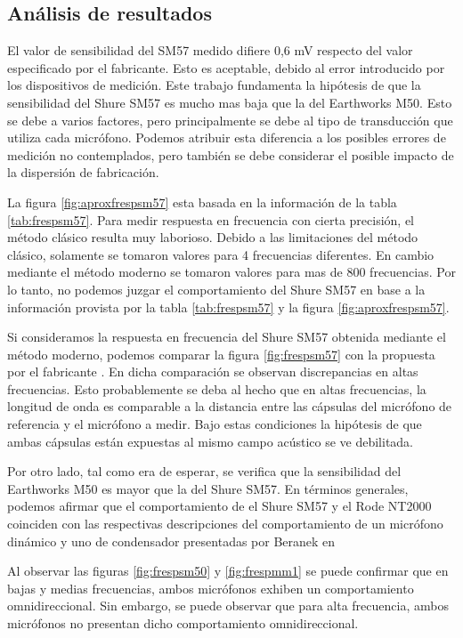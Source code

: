 \documentclass[]{article}
\begin{document}
\begin{multicols}{2}
\section{Análisis de resultados}
El valor de sensibilidad del SM57 medido difiere 0,6 mV respecto del valor
especificado por el fabricante. Esto es aceptable, debido al error introducido
por los dispositivos de medición. Este trabajo fundamenta la hipótesis de que
la sensibilidad del Shure SM57 es mucho mas baja que la del Earthworks M50.
Esto se debe a varios factores, pero principalmente se debe al tipo de
transducción que utiliza cada micrófono. Podemos atribuir esta diferencia a los
posibles errores de medición no contemplados, pero también se debe considerar
el posible impacto de la dispersión de fabricación.

La figura \ref{fig:aproxfrespsm57} esta basada en la información de la tabla
\ref{tab:frespsm57}. Para medir respuesta en frecuencia con cierta precisión,
el método clásico resulta muy laborioso. Debido a las limitaciones del método
clásico, solamente se tomaron  valores para 4 frecuencias diferentes. En cambio
mediante el método moderno se tomaron valores para mas de 800 frecuencias. Por
lo tanto, no podemos juzgar el comportamiento del Shure SM57 en base a la
información provista por la tabla \ref{tab:frespsm57} y la figura \ref{fig:aproxfrespsm57}.

Si consideramos la respuesta en frecuencia del Shure SM57 obtenida
mediante el método moderno, podemos comparar la figura \ref{fig:frespsm57} con la
propuesta por el fabricante \cite{shure57}. En dicha comparación se observan
discrepancias en altas frecuencias. Esto probablemente se deba al hecho que en
altas frecuencias, la longitud de onda es comparable a la distancia entre las
cápsulas del micrófono de referencia y el micrófono a medir. Bajo estas condiciones
la hipótesis de que ambas cápsulas están expuestas al mismo campo acústico se ve
debilitada.

Por otro lado, tal como era de esperar, se verifica que la sensibilidad del
Earthworks M50 es mayor que la del Shure SM57. En términos generales, podemos
afirmar que el comportamiento de el Shure SM57 y el Rode NT2000 coinciden con
las respectivas descripciones del comportamiento de un micrófono dinámico y uno
de condensador presentadas por Beranek en \cite{Beranek2012}

Al observar las figuras \ref{fig:frespsm50} y \ref{fig:frespmm1} se puede
confirmar que en bajas y medias frecuencias, ambos micrófonos exhiben un
comportamiento omnidireccional. Sin embargo, se puede observar que para alta
frecuencia, ambos micrófonos no presentan dicho comportamiento omnidireccional.


\end{multicols}
\end{document}
